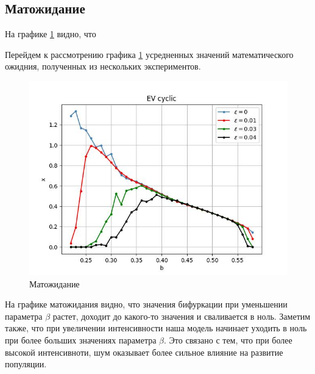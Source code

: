 \subsection{Матожидание}


    На графике \ref{EV_cyclic} видно, что 

    Перейдем к рассмотрению графика \ref{EV_cyclic} усредненных значений математического ожидния, полученных из нескольких экспериментов. 
        
    \begin{figure}
        \centering
        \includegraphics[width=\textwidth]{stochastic/images/EV_cyclic.jpg}
        
        \captionsetup{justification=centering}
        \caption{Матожидание}
        \label{EV_cyclic}
    \end{figure}

    На графике матожидания видно, что значения бифуркации при уменьшении параметра \(\beta\) растет, доходит до какого-то значения и сваливается в ноль. Заметим также, что при увеличении интенсивности наша модель начинает уходить в ноль при более больших значениях параметра \(\beta\). Это связано с тем, что при более высокой интенсивноти, шум оказывает более сильное влияние на развитие популяции.




